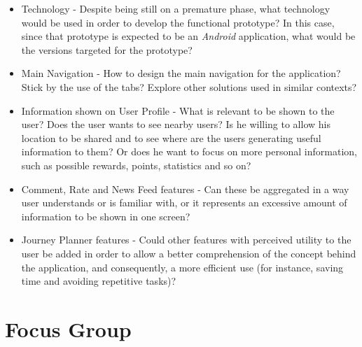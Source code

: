 \begin{itemize}
\item Technology - Despite being still on a premature phase, what technology would be used in order to develop the functional prototype? In this case, since that prototype is expected to be an \emph{Android} application, what would be the versions targeted for the prototype?

\item Main Navigation - How to design the main navigation for the application? Stick by the use of the tabs? Explore other solutions used in similar contexts? 

\item Information shown on User Profile - What is relevant to be shown to the user? Does the user wants to see nearby users? Is he willing to allow his location to be shared and to see where are the users generating useful information to them? Or does he want to focus on more personal information, such as possible rewards, points, statistics and so on?

\item Comment, Rate and News Feed features - Can these be aggregated in a way user understands or is familiar with, or it represents an excessive amount of information to be shown in one screen? 

\item Journey Planner features - Could other features with perceived utility to the user be added in order to allow a better comprehension of the concept behind the application, and consequently, a more efficient use (for instance, saving time and avoiding repetitive tasks)?

\end{itemize}


\section{Focus Group}